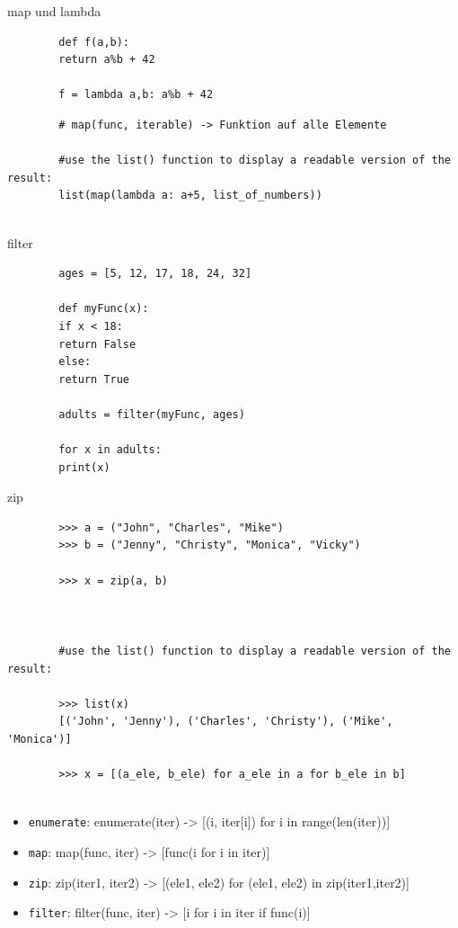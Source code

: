 \begin{frame}[fragile]{map und lambda}
	\begin{lstlisting}
		def f(a,b):
		return a%b + 42
		
		f = lambda a,b: a%b + 42
	\end{lstlisting}
	\pause 
	\begin{lstlisting}
		# map(func, iterable) -> Funktion auf alle Elemente
		
		#use the list() function to display a readable version of the result:
		list(map(lambda a: a+5, list_of_numbers))
		
	\end{lstlisting}
\end{frame}

\begin{frame}[fragile]{filter}
	\begin{lstlisting}
		ages = [5, 12, 17, 18, 24, 32]
		
		def myFunc(x):
		if x < 18:
		return False
		else:
		return True
		
		adults = filter(myFunc, ages)
		
		for x in adults:
		print(x) 
	\end{lstlisting}
\end{frame}

\begin{frame}[fragile]{zip}
	\begin{lstlisting}
		>>> a = ("John", "Charles", "Mike")
		>>> b = ("Jenny", "Christy", "Monica", "Vicky")
		
		>>> x = zip(a, b)
		
	
		
		#use the list() function to display a readable version of the result:
		
		>>> list(x)
		[('John', 'Jenny'), ('Charles', 'Christy'), ('Mike', 'Monica')]
		
		>>> x = [(a_ele, b_ele) for a_ele in a for b_ele in b]
		
	\end{lstlisting}
\end{frame}

\begin{frame}
	\begin{itemize}
		\item \texttt{enumerate}: enumerate(iter) -> [(i, iter[i]) for i in range(len(iter))]
		\item \texttt{map}: map(func, iter) -> [func(i for i in iter)]
		\item \texttt{zip}: zip(iter1, iter2) -> [(ele1, ele2) for (ele1, ele2) in zip(iter1,iter2)]
		\item \texttt{filter}: filter(func, iter) -> [i for i in iter if func(i)]
	\end{itemize}
\end{frame}

